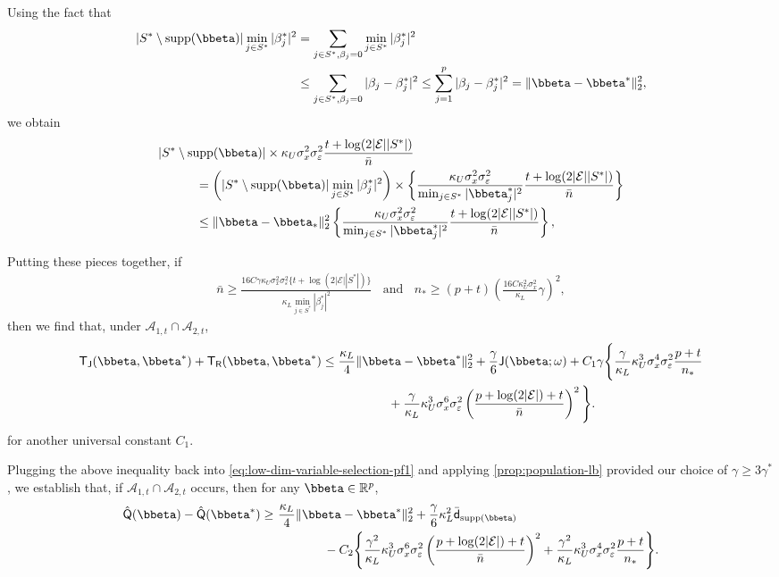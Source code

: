 \documentclass[10pt]{article}
\numberwithin{equation}{section}
\newcommand*{\supp}{\mathrm{supp}}
\begin{document}
Using the fact that
\begin{align*}
|S^*\setminus \supp(\bbeta)| \min_{j\in S^*} |\beta_j^*|^2 &= \sum_{j\in S^*, \beta_j=0} \min_{j\in S^*} |\beta_j^*|^2 \\
&\le \sum_{j\in S^*, \beta_j=0} |\beta_j - \beta^*_j|^2 \le \sum_{j=1}^p |\beta_j - \beta_j^*|^2 = \|\bbeta - \bbeta^*\|_2^2,
\end{align*} we obtain \begin{align}
&|S^*\setminus \supp(\bbeta)| \times \kappa_U \sigma_x^2\sigma_\varepsilon^2  \frac{t+ \log(2|\mathcal{E}||S^*|)}{\bar{n}} \nonumber \\
&~~~~~~~~~ = \left(|S^*\setminus \supp(\bbeta)| \min_{j\in S^*}|\beta_j^*|^2 \right) \times \left\{\frac{\kappa_U \sigma_x^2\sigma_\varepsilon^2}{ \min_{j\in S^*} |\bbeta_j^ *|^2}\frac{t+ \log(2|\mathcal{E}||S^*|)}{\bar{n}}\right\} \nonumber \\
&~~~~~~~~~ \le \|\bbeta - \bbeta_*\|_2^2  \left\{\frac{\kappa_U \sigma_x^2\sigma_\varepsilon^2}{ \min_{j\in S^*} |\bbeta_j^ *|^2}\frac{t+ \log(2|\mathcal{E}||S^*|)}{\bar{n}}\right\}, \label{eq:low-dim-bound-i4-1}
\end{align} 

Putting these pieces together, if 
\begin{align}
\label{eq:low-dim-cond-n-1}
    \bar{n} \ge \frac{16 C\gamma \kappa_U \sigma_x^2\sigma_\varepsilon^2 \{t + \log(2|\mathcal{E}||S^*|)\}}{ \kappa_L \min_{j\in S^*} |\beta_j^*|^2} ~~~~\text{and}~~~~ n_* \ge (p + t) \left(\frac{16C \kappa_U^2 \sigma_x^2}{\kappa_L }\gamma\right)^2,
\end{align} then we find that, under $\mathcal{A}_{1,t} \cap \mathcal{A}_{2,t}$,
\begin{align*}
    \mathsf{T}_{\mathsf{J}}(\bbeta, \bbeta^*) + \mathsf{T}_{\mathsf{R}}(\bbeta, \bbeta^*) &\le \frac{\kappa_L}{4} \|\bbeta - \bbeta^*\|_2^2 + \frac{\gamma}{6} \mathsf{J}(\bbeta;\omega) + C_1 \gamma\Bigg\{\frac{\gamma}{\kappa_L} \kappa_U^3 \sigma_x^4 \sigma_\varepsilon^2  \frac{p+t}{n_*} \\
    &~~~~~~~~~~~~~~~~ + \frac{\gamma}{\kappa_L} \kappa_U^3 \sigma_x^6 \sigma_\varepsilon^2 \left(\frac{p + \log(2|\mathcal{E}|) + t}{\bar{n}}\right)^2 \Bigg\}.
\end{align*} for another universal constant $C_1$.

Plugging the above inequality back into \eqref{eq:low-dim-variable-selection-pf1} and applying \cref{prop:population-lb} provided our choice of $\gamma \ge 3\gamma^*$, we establish that, if $\mathcal{A}_{1,t} \cap \mathcal{A}_{2,t}$ occurs, then for any $\bbeta \in \mathbb{R}^p$,
\begin{align*}
    \hat{\mathsf{Q}}(\bbeta) - \hat{\mathsf{Q}}(\bbeta^*) \ge &~\frac{\kappa_L}{4} \|\bbeta - \bbeta^*\|_2^2 + \frac{\gamma}{6} \kappa_L^2 \bar{\mathsf{d}}_{\supp(\bbeta)} \\
    &~~~~~~~~~~~~ - C_2 \Bigg\{ \frac{\gamma^2}{\kappa_L} \kappa_U^3 \sigma_x^6 \sigma_\varepsilon^2 \left(\frac{p + \log(2|\mathcal{E}|) + t}{\bar{n}}\right)^2 + \frac{\gamma^2}{\kappa_L} \kappa_U^3 \sigma_x^4 \sigma_\varepsilon^2 \frac{p + t}{n_*} \Bigg\}.
\end{align*}
\end{document}
